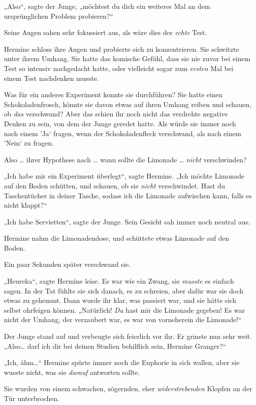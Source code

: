 {„Also“, sagte der Junge, „möchtest du dich ein weiteres Mal an dem ursprünglichen Problem probieren?“

Seine Augen sahen sehr fokussiert aus, als wäre dies der \emph{echte} Test.

Hermine schloss ihre Augen und probierte sich zu konzentrieren. Sie schwitzte unter ihrem Umhang. Sie hatte das komische Gefühl, dass sie nie zuvor bei einem Test so intensiv nachgedacht hatte, oder vielleicht sogar zum \emph{ersten} Mal bei einem Test nachdenken musste.

Was für ein anderes Experiment konnte sie durchführen? Sie hatte einen Schokoladenfrosch, könnte sie davon etwas auf ihren Umhang reiben und schauen, ob \emph{das} verschwand? Aber das schien ihr noch nicht das verdrehte negative Denken zu sein, von dem der Junge geredet hatte. Als würde sie immer noch nach einem 'Ja` fragen, wenn der Schokoladenfleck verschwand, als nach einem 'Nein` zu fragen.

Also … ihrer Hypothese nach … wann sollte die Limonade … \emph{nicht} verschwinden?

„Ich habe mir ein Experiment überlegt“, sagte Hermine. „Ich möchte Limonade auf den Boden schütten, und schauen, ob sie \emph{nicht} verschwindet. Hast du Taschentücher in deiner Tasche, sodass ich die Limonade aufwischen kann, falls es nicht klappt?“

„Ich habe Servietten“, sagte der Junge. Sein Gesicht sah immer noch neutral aus.

Hermine nahm die Limonadendose, und schüttete etwas Limonade auf den Boden.

Ein paar Sekunden später verschwand sie.

„Heureka“, sagte Hermine leise. Es war wie ein Zwang, sie \emph{musste} es einfach sagen. In der Tat fühlte sie sich danach, es zu schreien, aber dafür war sie doch etwas zu gehemmt. Dann wurde ihr klar, was passiert war, und sie hätte sich selbst ohrfeigen können. „Natürlich! \emph{Du} hast mir die Limonade gegeben! Es war nicht der Umhang, der verzaubert war, es war von vorneherein die Limonade!“

Der Junge stand auf und verbeugte sich feierlich vor ihr. Er grinste nun sehr weit. „Also… darf ich dir bei deinen Studien behilflich sein, Hermine Granger?“

„Ich, ähm…“ Hermine spürte immer noch die Euphorie in sich wallen, aber sie wusste nicht, was sie \emph{darauf} antworten sollte.

Sie wurden von einem schwachen, zögernden, eher \emph{widerstrebenden} Klopfen an der Tür unterbrochen.

}

